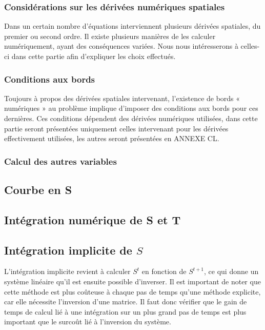 \subsubsection{Considérations sur les dérivées numériques spatiales}

Dans un certain nombre d’équations interviennent plusieurs dérivées spatiales,
du premier ou second ordre. Il existe plusieurs manières de les calculer
numériquement, ayant des conséquences variées. Nous nous intéresserons à
celles-ci dans cette partie afin d’expliquer les choix effectués.

\subsubsection{Conditions aux bords}

Toujours à propos des dérivées spatiales intervenant, l’existence de bords «
numériques » au problème implique d’imposer des conditions aux bords pour ces
dernières. Ces conditions dépendent des dérivées numériques utilisées, dans
cette partie seront présentées uniquement celles intervenant pour les dérivées
effectivement utilisées, les autres seront présentées en ANNEXE CL.

\subsubsection{Calcul des autres variables}

\subsection{Courbe en S}
%

\subsection{Intégration numérique de S et T}\subsection{Intégration implicite de $S$}
\label{ssec:integration_S_imp}
L'intégration implicite revient à calculer $S^t$ en fonction de $S^{t+1}$, ce qui donne un système linéaire qu'il est ensuite possible d'inverser. Il est important de noter que cette méthode est plus coûteuse à chaque pas de temps qu'une méthode explicite, car elle nécessite l'inversion d'une matrice. Il faut donc vérifier que le gain de temps de calcul lié à une intégration sur un plus grand pas de temps est plus important que le surcoût lié à l'inversion du système.

